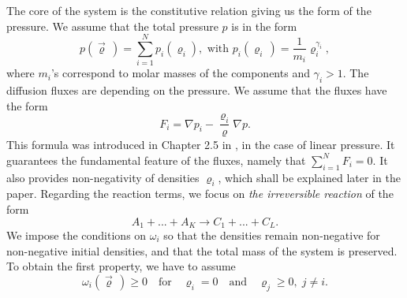 \documentclass[11pt]{article}
\numberwithin{equation}{section}
\numberwithin{tw}{section}
\begin{document}
The core of the system is the constitutive relation giving us the form of the pressure. We assume that the total pressure $p$ is in the form
\begin{equation}\label{pressure} p(\vec\varrho\,)=\sum_{i=1}^N p_i(\varrho_i), \mbox{ \ with \ }
p_i(\varrho_i\,)=\frac{1}{m_i}\varrho_i^{\gamma_i}, \end{equation} 
where $m_i$'s correspond to molar masses of the components and $\gamma_i>1$. 
%
The diffusion fluxes are depending on the pressure. We assume that the fluxes have the form 
\begin{equation}\label{flux}
 F_i = \nabla p_i -\frac{\varrho_i}{\varrho}\nabla p. 
 \end{equation}
This formula was introduced in Chapter 2.5 in \cite{Gi}, in the case of linear pressure. It  guarantees the fundamental feature of the fluxes, namely that 
$\sum_{i=1}^N F_i=0$. It also provides non-negativity of densities $\varrho_i$, which shall be explained later in the paper.
%
%
%
Regarding the reaction terms,
we  focus on {\it the irreversible reaction} of the form
 \begin{equation}\label{irreversible} A_1 + ...+ A_K \rightarrow C_1+ ... + C_L. 
 \end{equation}
We impose the conditions on $\omega_i$ so that the densities remain non-negative for non-negative initial densities, and that the total mass of the system is preserved. To obtain the first property, we have to assume
\begin{equation}\label{omega1} \omega_i(\vec\varrho\,)\geq 0 \quad \text{for} \quad \varrho_i=0 \quad \text{and} \quad \varrho_j\geq 0, \; j\neq i. \end{equation}
\end{document}
